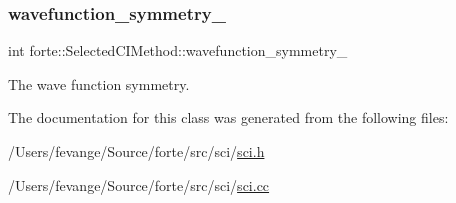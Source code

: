 \subsubsection{\texorpdfstring{wavefunction\+\_\+symmetry\+\_\+}{wavefunction\_symmetry\_}}
{\footnotesize\ttfamily int forte\+::\+Selected\+C\+I\+Method\+::wavefunction\+\_\+symmetry\+\_\+\hspace{0.3cm}{\ttfamily [protected]}}



The wave function symmetry. 



The documentation for this class was generated from the following files\+:\begin{DoxyCompactItemize}
\item 
/\+Users/fevange/\+Source/forte/src/sci/\mbox{\hyperlink{sci_8h}{sci.\+h}}\item 
/\+Users/fevange/\+Source/forte/src/sci/\mbox{\hyperlink{sci_8cc}{sci.\+cc}}\end{DoxyCompactItemize}
